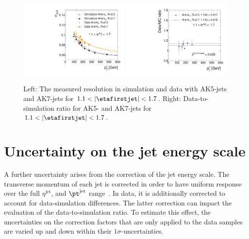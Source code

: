 \begin{figure}[!t]
  \centering
      \includegraphics[width=0.49\textwidth]{figures/resolution/systematicUncertainties/Resolution_for_3_eta_bin_MCUncertainty_RMS99.pdf}
      \includegraphics[width=0.49\textwidth]{figures/resolution/systematicUncertainties/Ratio_Resolution_for_3_eta_bin_PFCHS_RMS99_ak5_ak7_comparison.pdf}
  \caption{Left: The measured resolution in simulation and data with AK5-jets and AK7-jets for $1.1<|\etafirstjet|<1.7$. Right: Data-to-simulation ratio for AK5- and AK7-jets for $1.1<|\etafirstjet|<1.7$.}  
  \label{res:fig:MCuncertainty}
\end{figure}

\section*{Uncertainty on the jet energy scale}
A further uncertainty arises from the correction of the jet energy scale.
The transverse momentum of each jet is corrected in order to have uniform response over the full $\eta^{\text{jet}}$, and $\pt^{\text{jet}}$ range~\cite{bib:CMS:JERCPaper_2011}.
In data, it is additionally corrected to account for data-simulation differences.
The latter correction can impact the evaluation of the data-to-simulation ratio.
To estimate this effect, the uncertainties on the correction factors that are only applied to the data samples are varied up and down within their $1\sigma$-uncertainties.

